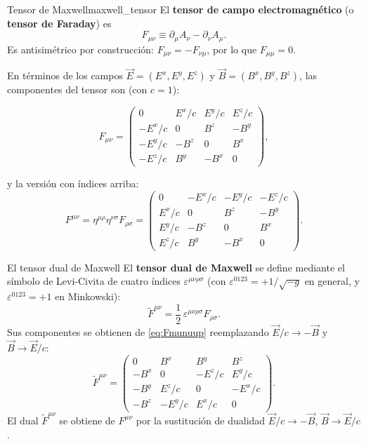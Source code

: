 \begin{definicion}{Tensor de Maxwell}{maxwell_tensor}
El \textbf{tensor de campo electromagnético} (o \textbf{tensor de Faraday}) es
\begin{equation}
  F_{\mu\nu} \equiv \partial_\mu A_\nu - \partial_\nu A_\mu.
  \label{eq:Fmunu}
\end{equation}
Es antisimétrico por construcción: $F_{\mu\nu} = -F_{\nu\mu}$, por lo que $F_{\mu\mu} = 0$.
\end{definicion}

En términos de los campos $\vec{E} = (E^x, E^y, E^z)$ y $\vec{B} = (B^x, B^y, B^z)$, las componentes del tensor son (con $c = 1$):

\begin{equation}
  F_{\mu\nu} =
  \begin{pmatrix}
    0    &  E^x/c &  E^y/c &  E^z/c \\
   -E^x/c &  0    &  B^z  & -B^y  \\
   -E^y/c & -B^z  &  0    &  B^x  \\
   -E^z/c &  B^y  & -B^x  &  0
  \end{pmatrix},
  \label{eq:Fmunu_componentes}
\end{equation}

y la versión con índices arriba:
\begin{equation}
  F^{\mu\nu} = \eta^{\mu\rho}\eta^{\nu\sigma}F_{\rho\sigma} =
  \begin{pmatrix}
    0    & -E^x/c & -E^y/c & -E^z/c \\
    E^x/c &  0    &  B^z  & -B^y  \\
    E^y/c & -B^z  &  0    &  B^x  \\
    E^z/c &  B^y  & -B^x  &  0
  \end{pmatrix}.
  \label{eq:Fmunuup}
\end{equation}

\begin{observacion}{El tensor dual de Maxwell}{}
El \textbf{tensor dual de Maxwell} se define mediante el símbolo de Levi-Civita de cuatro índices $\varepsilon^{\mu\nu\rho\sigma}$ (con $\varepsilon^{0123} = +1/\sqrt{-g}$ en general, y $\varepsilon^{0123} = +1$ en Minkowski):
\[
  \widetilde{F}^{\mu\nu} = \frac{1}{2}\,\varepsilon^{\mu\nu\rho\sigma}F_{\rho\sigma}.
\]
Sus componentes se obtienen de \eqref{eq:Fmunuup} reemplazando $\vec{E}/c \to -\vec{B}$ y $\vec{B} \to \vec{E}/c$:
\[
  \widetilde{F}^{\mu\nu} =
  \begin{pmatrix}
    0    &  B^x  &  B^y  &  B^z  \\
   -B^x  &  0    & -E^z/c & E^y/c  \\
   -B^y  &  E^z/c &  0    & -E^x/c \\
   -B^z  & -E^y/c &  E^x/c &  0
  \end{pmatrix}.
\]
El dual $\widetilde{F}^{\mu\nu}$ se obtiene de $F^{\mu\nu}$ por la sustitución de dualidad $\vec{E}/c \to -\vec{B}$, $\vec{B} \to \vec{E}/c$.
\end{observacion}

